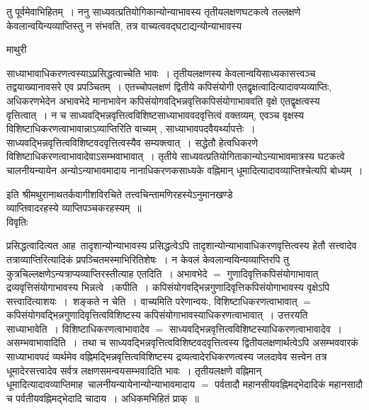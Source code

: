 \documentclass[10pt, openany]{book}
\begin{document}
{तु पूर्वमेवाभिहितम्~। ननु साध्यवत्प्रतियोगिकान्योन्याभावस्य तृतीयलक्षणघटकत्वे तल्लक्षणे केवलान्वयिन्यव्याप्तिस्तु न संभवति, तत्र वाच्यत्ववद्घटाद्यन्योन्याभावस्य
\newpage
\begin{center}  माथुरी  \end{center}
{\la साध्याभावाधिकरणत्वस्याऽप्रसिद्धत्वाच्चेति भावः~। तृतीयलक्षणस्य केवलान्वयिसाध्यकासत्त्वञ्च तद्वयाख्यानावसरे एव प्रपञ्चितम्~। एतच्चोपलक्षणं द्वितीये कपिसंयोगी एतद्वृक्षत्वादित्यादावप्यव्याप्तिः, अधिकरणभेदेन अभावभेदे मानाभावेन कपिसंयोगवद्भिन्नवृत्तिकपिसंयोगाभाववति वृक्षे एतद्वृक्षत्वस्य वृत्तित्वात्~। न च साध्यवद्भिन्नवृत्तित्वविशिष्टसाध्याभाववदवृत्तित्वं वक्तव्यम्, एवञ्च वृक्षस्य विशिष्टाधिकरणत्वाभावान्नाऽव्याप्तिरिति वाच्यम् , साध्याभावपदवैयर्थ्यापत्तेः~।  साध्यवद्भिन्नवृत्तित्वविशिष्टवदवृत्तित्वस्यैव सम्यक्त्वात्~। सद्धेतौ हेत्वधिकरणे विशिष्टाधिकरणत्वाभावादेवाऽसम्भवाभावात्~। तृतीये साध्यवत्प्रतियोगिताकान्योऽन्याभावमात्रस्य
घटकत्वे चालनीयन्यायेन अन्योऽन्याभावमादाय नानाधिकरणकसाध्यके वह्निमान् धूमादित्यादावव्याप्तिश्चेत्यपि बोध्यम्~।}
\begin{center} इति श्रीमथुरानाथतर्कवागीशविरचिते तत्त्वचिन्तामणिरहस्येऽनुमानखण्डे\\
व्याप्तिवादरहस्ये व्याप्तिपञ्चकरहस्यम्~॥\\    विवृतिः \end{center}
प्रसिद्धत्वादित्यत आह~तादृशान्योन्याभावस्य प्रसिद्धत्वेऽपि तादृशान्योन्याभावाधिकरणवृत्तित्वस्य हेतौ सत्त्वादेव
तत्राव्याप्तिरित्यादिकं प्रपञ्चितमस्माभिरितिशेषः~। न केवलं केवलान्वयिन्यव्याप्तिरपि तु कुत्रचिल्लक्षणेऽन्यत्राप्यव्याप्तिरस्तीत्याह एतदिति~। अभावभेदे $=$ गुणादिवृत्तिकपिसंयोगाभावात् द्रव्यवृत्तिसंयोगाभावस्य भिन्नत्वे~।{\la कपीति~।} कपिसंयोगवद्भिन्नगुणादिवृत्तिकपिसंयोगाभावस्य वृक्षेऽपि सत्त्वादित्याशयः~।~{\la शङ्कते न चेति~।} वाच्यमिति परेणान्वयः, विशिष्टाधिकरणत्वाभावात् $=$ कपिसंयोगवद्भिन्नगुणादिवृत्तित्वविशिष्टस्य कपिसंयोगाभावस्याधिकरणत्वाभावात्~। उत्तरयति {\qt साध्याभावेति~।} विशिष्टाधिकरणत्वाभावादेव $=$ साध्यवद्भिन्नवृत्तित्वविशिष्टस्याधिकरणत्वाभावादेव~। {\la असम्भवाभावादिति~।}~तथा च साध्यवद्भिन्नवृत्तित्वविशिष्टवदवृत्तित्वस्य द्वितीयलक्षणार्थत्वेऽपि असम्भववारकं साध्याभावपदं व्यर्थमेव वह्निमद्भिन्नवृत्तित्वविशिष्टस्य द्रव्यत्वादेरधिकरणत्वस्य जलदावेव सत्त्वेन तत्र धूमादेरसत्त्वादेव सर्वत्र लक्षणसमन्वयसम्भवादिति भावः~। तृतीयलक्षणे वह्निमान् धूमादित्यादावव्याप्तिमाह~चालनीयन्यायेनान्योन्याभावमादाय $=$ पर्वतादौ महानसीयवह्निमद्भेदादिकं महानसादौ च पर्वतीयवह्निमद्भेदादि चादाय~। अधिकमभिहितं प्राक्~॥
\begin{center}

\end{center}}
\end{document}
